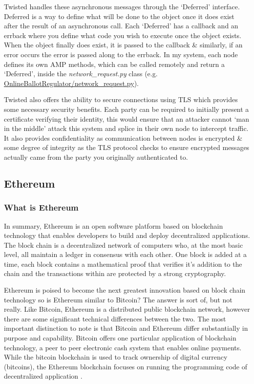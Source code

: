\documentclass{article}
\begin{document}
Twisted handles these asynchronous messages through the `Deferred' interface. Deferred is a way to define what will be done to the object once it does exist after the result of an asynchronous call. Each `Deferred' has a callback and an errback where you define what code you wish to execute once the object exists. When the object finally does exist, it 
is passed to the callback \& similarly, if an error occurs the error is passed along to the errback. In my system, each node defines its own AMP methods, which can be called remotely and return a `Deferred', inside the \textit{network\_request.py} class (e.g. \href{https://github.com/Mattie432/Blockchain-Voting-System/blob/master/Programming/4_OnlineBallotRegulator/onlineballotregulator/network_request.py}{OnlineBallotRegulator/network\_request.py}).

Twisted also offers the ability to secure connections using TLS which provides some necessary security benefits. Each party can be required to initially present a certificate verifying their identity, this would ensure that an attacker cannot `man in the middle' attack this system and splice in their own node to intercept traffic. It also provides confidentiality as communication between nodes is encrypted \& some degree of integrity as the TLS protocol checks to ensure encrypted messages actually came from the party you originally authenticated to.


\cleardoublepage
\subsection{Ethereum}
\subsubsection{What is Ethereum}
In summary, Ethereum is an open software platform based on blockchain technology that enables developers to build and deploy decentralized applications. The block chain is a decentralized network of computers who, at the most basic level, all maintain a ledger in consensus with each other. One block is added at a time, each block contains a mathematical proof that verifies it's addition to the chain and the transactions within are protected by a strong cryptography.
 
Ethereum is poised to become the next greatest innovation based on block chain technology so is Ethereum similar to Bitcoin? The answer is sort of, but not really. Like Bitcoin, Ethereum is a distributed public blockchain network, however there are some significant technical differences between the two. The most important distinction to note is that Bitcoin and Ethereum differ substantially in purpose and capability. Bitcoin offers one particular application of blockchain technology, a peer to peer electronic cash system that enables online payments. While the bitcoin blockchain is used to track ownership of digital currency (bitcoins), the Ethereum blockchain focuses on running the programming code of decentralized application \citep{55_what_is_ethereum_a_step-by-step_beginners_guide_2017}.
\end{document}
